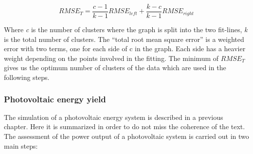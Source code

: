\begin{itemize}
\begin{equation}\label{eq:total_RMSE}
  RMSE_T = \frac{c-1}{k-1}RMSE_{left}+\frac{k-c}{k-1}RMSE_{right}
\end{equation}



Where \textit{c} is the number of clusters where the graph is split into the two fit-lines, \textit{k} is the total number of clusters. The ``total root mean square error'' is a weighted error with two terms, one for each side of c in the graph. Each side has a heavier weight depending on the points involved in the fitting. The minimum of $RMSE_{T}$ gives us the optimum number of clusters of the data \citep{Zagouras2013} which are used in the following steps.
 
\end{itemize}
 
\subsubsection{Photovoltaic energy yield}

The simulation of a photovoltaic energy system is described in a previous chapter. Here it is summarized in order to do not miss the coherence of the text.\\

The assessment of the power output of a photovoltaic system is carried out in two main steps:

